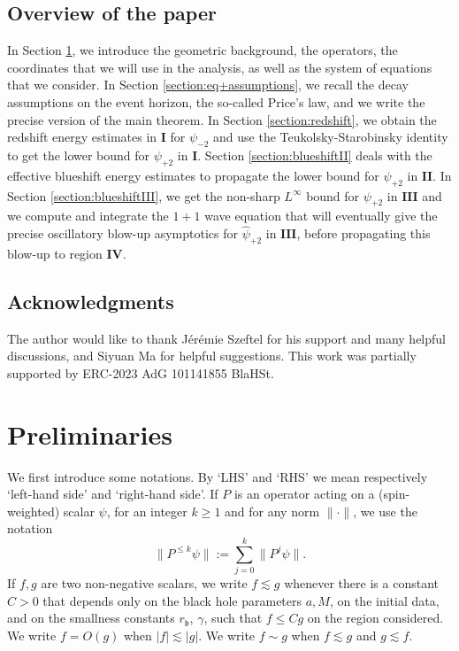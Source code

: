 \documentclass[reqno]{amsart}
\numberwithin{equation}{section}
\newcommand{\quatre}{\mathbf{IV}}
\newcommand{\app}{‘}
\newcommand{\psihat}{\widehat{\psi}}
\newcommand{\un}{\mathbf{I}}
\newcommand{\deux}{\mathbf{II}}
\newcommand{\trois}{\mathbf{III}}
\newcommand{\rb}{r_\mathfrak{b}}
\newcommand{\psip}{\psi_{+2}}
\newcommand{\psim}{\psi_{-2}}
\newcommand{\psihatp}{\psihat_{+2}}
\theoremstyle{plain}
\theoremstyle{definition}
\theoremstyle{remark}
\numberwithin{equation}{section}
\begin{document}
\subsection{Overview of the paper}
In Section \ref{section:preliminaries}, we introduce the geometric background, the operators, the coordinates that we will use in the analysis, as well as the system of equations that we consider. In Section \ref{section:eq+assumptions}, we recall the decay assumptions on the event horizon, the so-called Price's law, and we write the precise version of the main theorem. In Section \ref{section:redshift}, we obtain the redshift energy estimates in $\un$ for $\psim$ and use the Teukolsky-Starobinsky identity to get the lower bound for $\psip$ in $\un$. Section \ref{section:blueshiftII} deals with the effective blueshift energy estimates to propagate the lower bound for $\psip$ in $\deux$. In Section \ref{section:blueshiftIII}, we get the non-sharp $L^\infty$ bound for $\psip$ in $\trois$ and we compute and integrate the $1+1$ wave equation that will eventually give the precise oscillatory blow-up asymptotics for $\psihatp$ in $\trois$, before propagating this blow-up to region $\quatre$.

\subsection{Acknowledgments}
The author would like to thank Jérémie Szeftel for his support and many helpful discussions, and Siyuan Ma for helpful suggestions. This work was partially supported by ERC-2023 AdG 101141855 BlaHSt.

\section{Preliminaries}\label{section:preliminaries}
We first introduce some notations. By \app LHS' and \app RHS' we mean respectively \app left-hand side' and \app right-hand side'. If $P$ is an operator acting on a (spin-weighted) scalar $\psi$, for an integer $k\geq 1$ and for any norm $\|\cdot\|$, we use the notation 
$$\|P^{\leq k}\psi\|:=\sum_{j=0}^k\|P^j\psi\|.$$
If $f,g$ are two non-negative scalars, we write $f\lesssim g$ whenever there is a constant $C>0$ that depends only on the black hole parameters $a,M$, on the initial data, and on the smallness constants $\rb$, $\gamma$, such that $f\leq Cg$ on the region considered. We write $f=O(g)$ when $|f|\lesssim |g|$. We write $f\sim g$ when $f\lesssim g$ and $g\lesssim f$.
\end{document}
